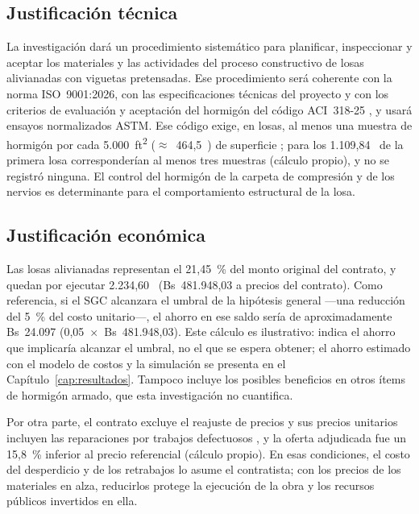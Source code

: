 \subsection{Justificación técnica}
La investigación dará un procedimiento sistemático para planificar, inspeccionar y aceptar los materiales y las actividades del proceso constructivo de losas alivianadas con viguetas pretensadas. Ese procedimiento será coherente con la norma ISO~9001:2026, con las especificaciones técnicas del proyecto y con los criterios de evaluación y aceptación del hormigón del código ACI~318-25 \parencite[sección~26.12, pp.~601--607]{aci318_2025}, y usará ensayos normalizados ASTM. Ese código exige, en losas, al menos una muestra de hormigón por cada 5.000~ft\textsuperscript{2} ($\approx$~464,5~\mdos{}) de superficie \parencite[sección~26.12.2.1, p.~603]{aci318_2025}; para los 1.109,84~\mdos{} de la primera losa corresponderían al menos tres muestras (cálculo propio), y no se registró ninguna. El control del hormigón de la carpeta de compresión y de los nervios es determinante para el comportamiento estructural de la losa.

\subsection{Justificación económica}
Las losas alivianadas representan el 21,45~\% del monto original del contrato, y quedan por ejecutar 2.234,60~\mdos{} (Bs~481.948,03 a precios del contrato). Como referencia, si el SGC alcanzara el umbral de la hipótesis general ---una reducción del 5~\% del costo unitario---, el ahorro en ese saldo sería de aproximadamente Bs~24.097 (0,05~$\times$~Bs~481.948,03). Este cálculo es ilustrativo: indica el ahorro que implicaría alcanzar el umbral, no el que se espera obtener; el ahorro estimado con el modelo de costos y la simulación se presenta en el Capítulo~\ref{cap:resultados}. Tampoco incluye los posibles beneficios en otros ítems de hormigón armado, que esta investigación no cuantifica.

Por otra parte, el contrato excluye el reajuste de precios y sus precios unitarios incluyen las reparaciones por trabajos defectuosos \parencite[pp.~92, 95]{uatf2025pao2}, y la oferta adjudicada fue un 15,8~\% inferior al precio referencial (cálculo propio). En esas condiciones, el costo del desperdicio y de los retrabajos lo asume el contratista; con los precios de los materiales en alza, reducirlos protege la ejecución de la obra y los recursos públicos invertidos en ella.

